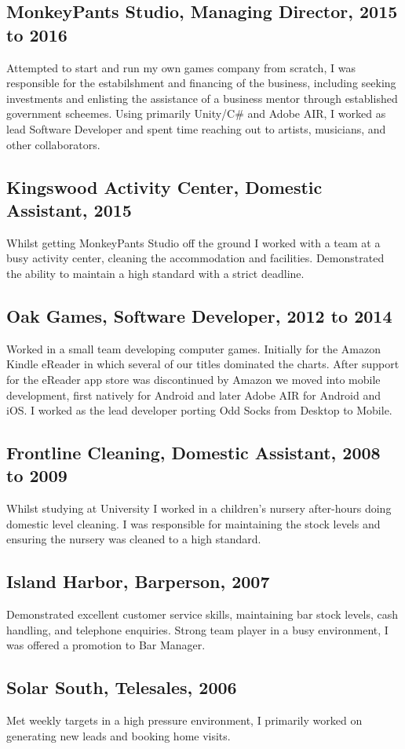 \documentclass{article}
\begin{document}
\subsection{MonkeyPants Studio, Managing Director, 2015 to 2016}
Attempted to start and run my own games company from scratch, I was responsible for the estabilshment and financing of the business, including seeking investments and enlisting the assistance of a business mentor through established government scheemes.  Using primarily Unity/C\# and Adobe AIR, I worked as lead Software Developer and spent time reaching out to artists, musicians, and other collaborators.
\subsection{Kingswood Activity Center, Domestic Assistant, 2015}
Whilst getting MonkeyPants Studio off the ground I worked with a team at a busy activity center, cleaning the accommodation and facilities.  Demonstrated the ability to maintain a high standard with a  strict deadline.
\subsection{Oak Games, Software Developer, 2012 to 2014}
Worked in a small team developing computer games.  Initially for the Amazon Kindle eReader in which several of our titles dominated the charts.  After support for the eReader app store was discontinued by Amazon we moved into mobile development, first natively for Android and later Adobe AIR for Android and iOS.  I worked as the lead developer porting Odd Socks from Desktop to Mobile.
\subsection{Frontline Cleaning, Domestic Assistant, 2008 to 2009}
Whilst studying at University I worked in a children's nursery after-hours doing domestic level cleaning.  I was responsible for maintaining the stock levels and ensuring the nursery was cleaned to a high standard.
\subsection{Island Harbor, Barperson, 2007}
Demonstrated excellent customer service skills, maintaining bar stock levels, cash handling, and telephone enquiries.  Strong team player in a busy environment, I was offered a promotion to Bar Manager.
\subsection{Solar South, Telesales, 2006}
Met weekly targets in a high pressure environment, I primarily worked on generating new leads and booking home visits.
\end{document}
